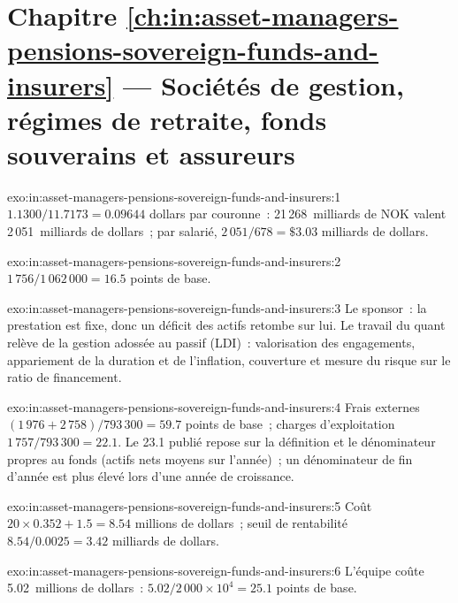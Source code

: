 \section*{Chapitre \ref{ch:in:asset-managers-pensions-sovereign-funds-and-insurers} --- Sociétés de gestion, régimes de retraite, fonds souverains et assureurs}

\begin{solution}{exo:in:asset-managers-pensions-sovereign-funds-and-insurers:1}
$1.1300/11.7173=0.09644$ dollars par couronne~: 21\,268~milliards de NOK valent 2\,051~milliards de dollars~; par salarié, $2\,051/678=\$3.03$
milliards de dollars.
\end{solution}

\begin{solution}{exo:in:asset-managers-pensions-sovereign-funds-and-insurers:2}
$1\,756/1\,062\,000=16.5$ points de base.
\end{solution}

\begin{solution}{exo:in:asset-managers-pensions-sovereign-funds-and-insurers:3}
Le sponsor~: la prestation est fixe, donc un déficit des actifs retombe sur lui. Le travail du quant relève de la gestion adossée au
passif (LDI)~: valorisation des engagements, appariement de la duration et de l'inflation, couverture et mesure du risque sur le ratio de financement.
\end{solution}

\begin{solution}{exo:in:asset-managers-pensions-sovereign-funds-and-insurers:4}
Frais externes $(1\,976+2\,758)/793\,300=59.7$ points de base~; charges d'exploitation $1\,757/793\,300=22.1$. Le 23.1 publié
repose sur la définition et le dénominateur propres au fonds (actifs nets moyens sur l'année)~; un dénominateur de fin d'année est
plus élevé lors d'une année de croissance.
\end{solution}

\begin{solution}{exo:in:asset-managers-pensions-sovereign-funds-and-insurers:5}
Coût $20\times0.352+1.5=8.54$ millions de dollars~; seuil de rentabilité $8.54/0.0025=3.42$ milliards de dollars.
\end{solution}

\begin{solution}{exo:in:asset-managers-pensions-sovereign-funds-and-insurers:6}
L'équipe coûte 5.02~millions de dollars~: $5.02/2\,000\times10^4=25.1$ points de base.
\end{solution}

